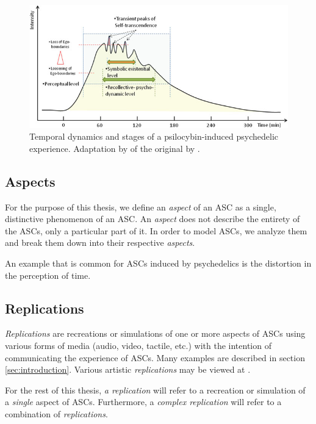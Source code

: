\begin{figure}[H]
    \centering
    \ifgraphics
        \includegraphics[width=\textwidth]{img/reused/preller2016phenomenology1.png}
    \fi
    \caption{Temporal dynamics and stages of a psilocybin-induced psychedelic experience. Adaptation by \textcite{preller2016phenomenology} of the original by \textcite{leuner1962experimentelle}.}\label{fig:temporal-dynamics}
\end{figure}

\subsection{Aspects}
For the purpose of this thesis, we define an \textit{aspect} of an \ac{ASC} as a single, distinctive phenomenon of an \ac{ASC}. An \textit{aspect} does not describe the entirety of the \acp{ASC}, only a particular part of it. In order to model \acp{ASC}, we analyze them and break them down into their respective \textit{aspects}.

An example that is common for \acp{ASC} induced by psychedelics is the distortion in the perception of time.

\subsection{Replications}
\textit{Replications} are recreations or simulations of one or more aspects of \acp{ASC} using various forms of media (audio, video, tactile, etc.) with the intention of communicating the experience of \acp{ASC}. Many examples are described in section \ref{sec:introduction}. Various artistic \textit{replications} may be viewed at \textcite{pw2022replications}.

For the rest of this thesis, \textit{a replication} will refer to a recreation or simulation of a \textit{single} aspect of \acp{ASC}. Furthermore, a \textit{complex replication} will refer to a combination of \textit{replications}.

